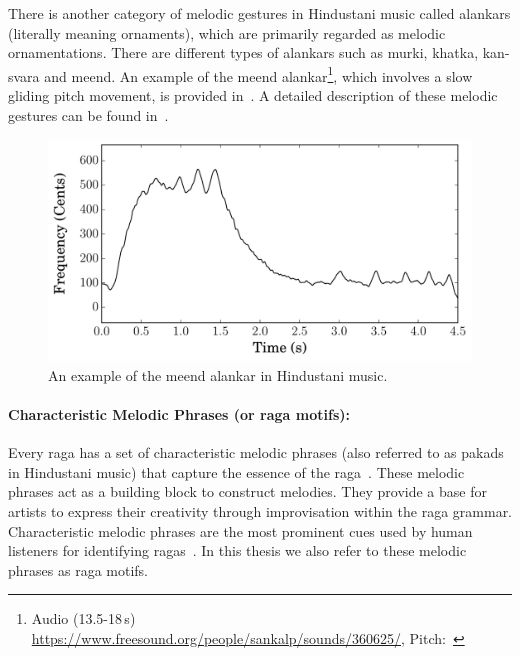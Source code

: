 There is another category of melodic gestures in Hindustani music called \glspl{alankar} (literally meaning ornaments), which are primarily regarded as melodic ornamentations. There are different types of \glspl{alankar} such as \gls{murki}, \gls{khatka}, kan-\gls{svara} and \gls{meend}. An example of the \gls{meend} \gls{alankar}\footnote{Audio (13.5-18\,s) \url{https://www.freesound.org/people/sankalp/sounds/360625/}, Pitch:~}, which involves a slow gliding pitch movement, is provided in~. A detailed description of these melodic gestures can be found in~\cite{Bagchee1998}.

\begin{figure}
	\begin{center}
		\includegraphics[width=\figSizeEighty]{ch02_background/figures/DemoAlankar_13_5__18.pdf}
	\end{center}
	\caption[An example of the \gls{meend} \gls{alankar} in Hindustani music]{An example of the \gls{meend} \gls{alankar} in Hindustani music.}
	\label{fig:meend_todi}
\end{figure}


\paragraph{Characteristic Melodic Phrases (or \gls{raga} motifs):} Every \gls{raga} has a set of characteristic melodic phrases (also referred to as pakads in Hindustani music) that capture the essence of the \gls{raga}~\citep{Bagchee1998,rao1999raga,Viswanathan2004}. These melodic phrases act as a building block to construct melodies. They provide a base for artists to express their creativity through improvisation within the \gls{raga} grammar. Characteristic melodic phrases are the most prominent cues used by human listeners for identifying \glspl{raga}~\citep{krishna2012carnatic,Suvarnalata2014}. In this thesis we also refer to these melodic phrases as \gls{raga} motifs.

